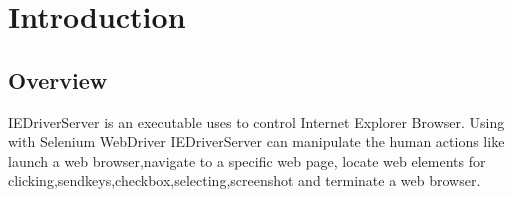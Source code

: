 \section{Introduction}\label{sec:introduction}
\subsection{Overview}\label{subsec:overview}
IEDriverServer is an executable uses to control Internet Explorer Browser.
Using with Selenium WebDriver IEDriverServer can manipulate the human actions like launch a web browser,navigate to a specific web page,
locate web elements for clicking,sendkeys,checkbox,selecting,screenshot and terminate a web browser.